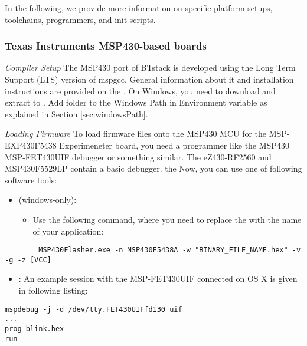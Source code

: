 
In the following, we provide more information on specific platform setups, toolchains, programmers, and init scripts.

\subsubsection{Texas Instruments MSP430-based boards}

\emph{Compiler Setup} The MSP430 port of BTstack is developed using the Long Term Support (LTS) version of mspgcc. General information about it and installation instructions are provided on the \MSPGCCWiki{}. On Windows, you need to download and extract \mspgcc{} to . Add  folder to the Windows Path in Environment variable as explained in Section \ref{sec:windowsPath}.

\emph{Loading Firmware} To load firmware files onto the MSP430 MCU for the MSP-EXP430F5438 Experimeneter board, you need a programmer like the MSP430 MSP-FET430UIF debugger or something similar. The eZ430-RF2560 and MSP430F5529LP contain a basic debugger. the Now, you can use one of following software tools:

 \begin{itemize}
 \item  \MSPFlasher{} (windows-only):
 	\begin{itemize}
 	   \item Use the following command, where you need to replace the  with the name of your application:
	\end{itemize} 
\end{itemize}
	
	   \begin{lstlisting}
 		MSP430Flasher.exe -n MSP430F5438A -w "BINARY_FILE_NAME.hex" -v -g -z [VCC]
	   \end{lstlisting}

 \begin{itemize}
	
	\item \MSPDebug{}: An example session with the MSP-FET430UIF connected on OS X is given in following listing:
\end{itemize}

\begin{lstlisting}
mspdebug -j -d /dev/tty.FET430UIFfd130 uif
... 
prog blink.hex
run
\end{lstlisting}

